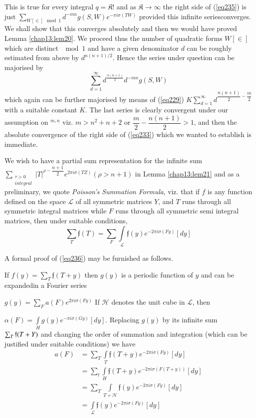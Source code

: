  This is true for every integral $q = \mathfrak{K}!$ and as
 $\mathfrak{K} \to \infty$ the 
 right side of (\ref{eq235}) is just $\sum\limits_{W[\in] \mod 1}
 d^{-mn} g (S, W) e^{- \pi i \sigma (T W)}$ provided this infinite
 series\pageoriginale  converges. We shall show that this converges
 absolutely and 
 then we would have proved Lemma \ref{chap13:lem20}. We proceed thus
 the number of 
 quadratic forms $W[\in]$ which are distinct $\mod 1$ and have
 a given denominator $d$ can be roughly estimated from above by
 $d^{n(n+1)/2}$. Hence the series under question can be majorised by  
 $$
 \sum_{d = 1}^\infty d^{\frac{n(n+1)}{2}} d^{-mn} g(S, W)
 $$
 which again can be further majorised by means of (\ref{eq229}) \break $K
 \sum^\infty_{d = 1} d^{\dfrac{n(n+1)}{2} - \dfrac{m}{2}}$ with a
 suitable constant $K$. The last series is clea\-rly convergent under
 our assumption on $^{m, n}$ viz. $m > n^2 + n + 2$ or $\dfrac{m}{2} -
 \dfrac{n(n+1)}{2}>1$, and then the absolute convergence of the right
 side of (\ref{eq233}) which we wanted to establish is immediate. 
 
 We wish to have a partial sum representation for the  infinite sum  
 $\sum\limits_{\substack{ \tau > 0 \\ integral }} |T|^{\rho -
   \dfrac{n+1}{2}}e^{2 \pi i \sigma (TZ)} (\rho > n +1 )$ in Lemma
 \ref{chap13:lem21} and as a preliminary, we quote \textit{ Poisson's Summation
   Formula}, viz. that if $f$ is any function defined on the space
 $\mathscr{L}$ of all symmetric matrices $Y$, and $T$ runs through all
 symmetric integral matrices while $F$ runs through all symmetric semi
 integral matrices, then under suitable conditions, 
 \begin{equation*}
\sum_T \mathfrak{f} (T) = \sum_F \int\limits_{\mathscr{L}} \mathfrak{f}
(y) e^{-2 \pi i \sigma (F y)} [d y] \tag{236}\label{eq236}  
 \end{equation*} 
 
 A formal proof of (\ref{eq236}) may be furnished as follows.
 
 If $f(y) = \sum_T \mathfrak{f} (T + y)$ then $g(y)$ is a
 periodic function of $y$ and can be expanded\pageoriginale  in a
 Fourier series  
 
 \noindent
 $g(y) = \sum_F a (F) e^{2 \pi i \sigma (F y)}$ If
 $\mathcal{H}$ denotes the unit cube in $\mathscr{L}$, then  

$\alpha (F) = \int\limits_H g (y) e^{-\pi i \sigma (G y)} [d
   y]$. Replacing $g(y)$ by its infinite sum $\sum_T
 \mathfrak{f}\break (T + Y)$ and changing the order of summation and
 integration (which can be justified under suitable conditions) we
 have 
\begin{align*}
a (F) & = \sum_T \int\limits_T \mathfrak{f} (T + y) e^{-2 \pi i \sigma
  (F y)} [d y]\\ 
& = \sum_t \int\limits_H \mathfrak{f} (T + y) e^{- 2 \pi i \sigma (F(T
  +y))} [d y]\\ 
& = \sum_T \int\limits_{T + \mathcal{H}} \mathfrak{f} (y) e^{-2 \pi i
  \sigma (F y)}[d y]\\ 
& = \int\limits_{\mathscr{L}} \mathfrak{f} (y) e^{-2 \pi i \sigma (F
  y)}[d y] 
\end{align*}

